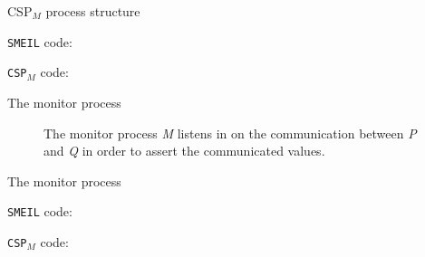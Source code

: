 \documentclass[13pt]{beamer}
\newcommand{\cspm}{CSP$_M$}
\begin{document}
%
\begin{frame}{\cspm{} process structure}
 \begin{block}{}
   \texttt{SMEIL} code:
     \vspace{5mm}

      \scalebox{0.8}{\usebox{\smeilprocessexample}}
 \end{block}
 \pause
 \begin{block}{}
    \texttt{\cspm{}} code:
      \vspace{5mm}

       \scalebox{0.8}{\usebox{\cspmprocessexample}}
 \end{block}

\end{frame}
%
\begin{frame}{The monitor process}
 \begin{block}{}
     \begin{figure}[!ht]
      \centering
      \caption{The monitor process \textit{M} listens in on the communication between \textit{P} and \textit{Q} in order to assert the communicated values.}
      \label{fig:assertion_process}
    \end{figure}
 \end{block}
\end{frame}
\begin{frame}{The monitor process}
 \begin{block}{}
   \texttt{SMEIL} code:
     \vspace{5mm}

      \scalebox{0.8}{\usebox{\smeilchannelexample}}
 \end{block}
 \pause
 \begin{block}{}
    \texttt{\cspm{}} code:
      \vspace{5mm}

       \scalebox{0.8}{\usebox{\cspmmonitorexample}}
 \end{block}

\end{frame}
\end{document}
